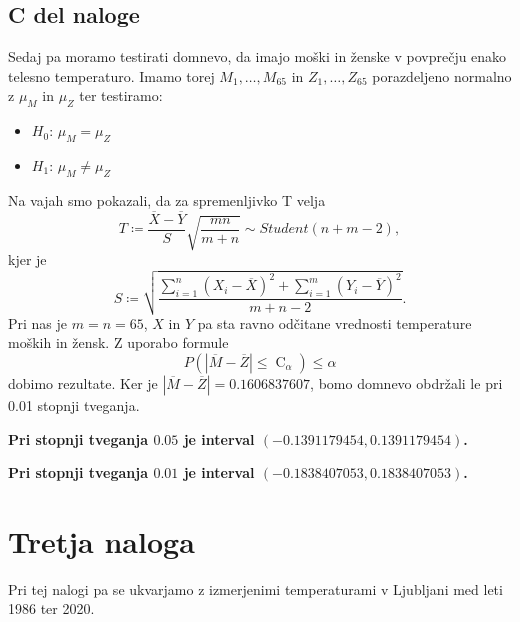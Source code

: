\documentclass{article}
\DeclareMathOperator{\CM}{C}
\begin{document}
    \subsection{C del naloge}
    Sedaj pa moramo testirati domnevo, da imajo moški in ženske v povprečju enako telesno temperaturo. Imamo torej $M_{1}, \ldots, M_{65}$ in $Z_{1}, \ldots, Z_{65}$ porazdeljeno
    normalno z $\mu_{M}$ in $\mu_{Z}$ ter testiramo:
    \begin{itemize}
        \item $H_{0}$: $\mu_{M} = \mu_{Z}$
        \item $H_{1}$: $\mu_{M} \neq \mu_{Z}$
    \end{itemize}
    Na vajah smo pokazali, da za spremenljivko T velja
    \[
        T \coloneqq \frac{\overline{X} - \overline{Y}}{S}\sqrt{\frac{mn}{m + n}} \sim Student(n + m - 2),
    \]
    kjer je
    \[
        S \coloneqq \sqrt{\frac{\sum_{i = 1}^n (X_{i} - \overline{X})^2 + \sum_{i = 1}^m (Y_{i} - \overline{Y})^2}{m + n - 2}}.
    \]
    Pri nas je $m = n = 65$, $X$ in $Y$ pa sta ravno odčitane vrednosti temperature moških in žensk. Z uporabo formule
    \[
        P(|\overline{M} - \overline{Z}| \leq \CM_{\alpha}) \leq \alpha 
    \]
    dobimo rezultate. Ker je $|\overline{M} - \overline{Z}| = 0.1606837607$, bomo domnevo obdržali le pri 0.01 stopnji tveganja.
    \par \textbf{Pri stopnji tveganja $0.05$ je interval $(-0.1391179454, 0.1391179454)$.}
    \par \textbf{Pri stopnji tveganja $0.01$ je interval $(-0.1838407053, 0.1838407053)$.}

    \section{Tretja naloga}
    Pri tej nalogi pa se ukvarjamo z izmerjenimi temperaturami v Ljubljani med leti 1986 ter 2020.
\end{document}
